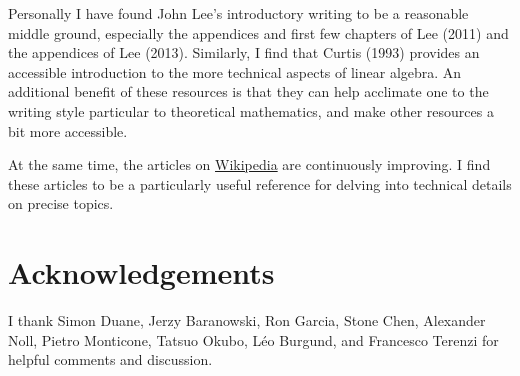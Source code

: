 \documentclass[
  letterpaper,
  DIV=11,
  numbers=noendperiod]{scrartcl}
\begin{document}
Personally I have found John Lee's introductory writing to be a
reasonable middle ground, especially the appendices and first few
chapters of Lee (2011) and the appendices of Lee (2013). Similarly, I
find that Curtis (1993) provides an accessible introduction to the more
technical aspects of linear algebra. An additional benefit of these
resources is that they can help acclimate one to the writing style
particular to theoretical mathematics, and make other resources a bit
more accessible.

At the same time, the articles on
\href{https://en.wikipedia.org/wiki/Mathematics}{Wikipedia} are
continuously improving. I find these articles to be a particularly
useful reference for delving into technical details on precise topics.

\section*{Acknowledgements}\label{acknowledgements}

I thank Simon Duane, Jerzy Baranowski, Ron Garcia, Stone Chen, Alexander
Noll, Pietro Monticone, Tatsuo Okubo, Léo Burgund, and Francesco Terenzi
for helpful comments and discussion.
\end{document}
